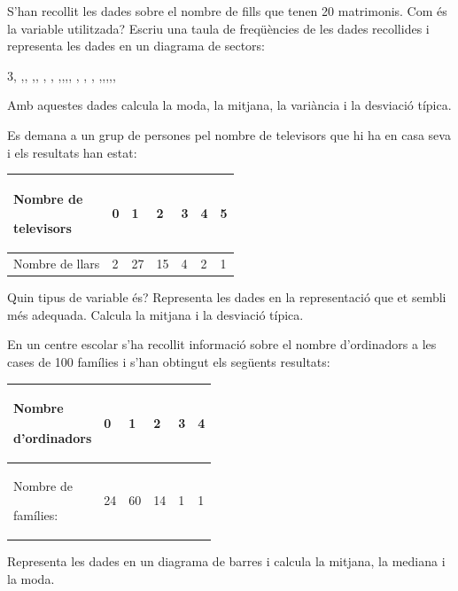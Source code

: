 \begin{mylist}
	
 \exer[1] S'han recollit les dades sobre el nombre de fills que tenen 20 matrimonis. Com és la variable utilitzada? Escriu una taula de freqüències de les dades recollides i representa les dades en un diagrama de sectors:  
\begin{center}
3, ,, ,, , , ,,,, , , , ,,,,,
\end{center}
 Amb aquestes dades calcula la moda, la mitjana, la variància i la desviació típica. 
  

\vso

 \exer[1] Es demana a un grup de persones pel nombre de televisors que hi ha en casa seva i els resultats han estat: 

\begin{longtable}{|p{1.2in}|p{0.2in}|p{0.2in}|p{0.2in}|p{0.2in}|p{0.2in}|p{0.2in}|} \hline 
Nombre de \par televisors & 0 & 1 & 2 & 3 & 4 & 5 \\ \hline 
Nombre de llars & 2 & 27 & 15 & 4 & 2 & 1 \\ \hline 
\end{longtable}

Quin tipus de variable és? Representa les dades en la representació que et sembli més adequada. Calcula la mitjana i la desviació típica.


\vso

\exer[1] En un centre escolar s'ha recollit informació sobre el nombre d'ordinadors a les cases de 100 famílies i s'han obtingut els següents resultats: 

\begin{longtable}{|p{1.3in}|p{0.3in}|p{0.3in}|p{0.3in}|p{0.3in}|p{0.3in}|} \hline 
Nombre \par d'ordinadors & 0 & 1 & 2 & 3 & 4 \\ \hline 
Nombre de \par famílies: & 24 & 60 & 14 & 1 & 1 \\ \hline 
\end{longtable}

Representa les dades en un diagrama de barres i calcula la mitjana, la mediana i la moda.
 

\end{mylist}
